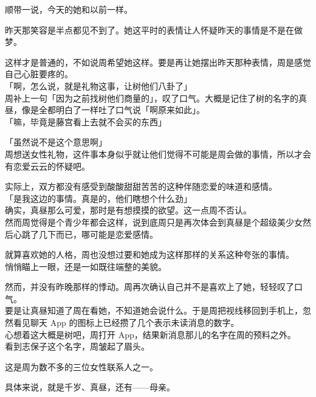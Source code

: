 顺带一说，今天的她和以前一样。

昨天那笑容是半点都见不到了。她这平时的表情让人怀疑昨天的事情是不是在做梦。

这样才是普通的，不如说周希望她这样。要是再让她摆出昨天那种表情，周是感觉自己心脏要疼的。\\

「啊，怎么说，就是礼物这事，让树他们八卦了」\\

周补上一句「因为之前找树他们商量的」，叹了口气。大概是记住了树的名字的真昼，像是全都明白了一样吐了口气说「啊原来如此」。\\

「嘛，毕竟是藤宫看上去就不会买的东西」

「虽然说不是这个意思啊」\\

周想送女性礼物，这件事本身似乎就让他们觉得不可能是周会做的事情，所以才会有恋爱云云的怀疑吧。

实际上，双方都没有感受到酸酸甜甜苦苦的这种伴随恋爱的味道和感情。\\

「是我这边的事情。真是的，他们瞎想个什么劲」\\

确实，真昼那么可爱，那时是有想摸摸的欲望。这一点周不否认。\\

然而周觉得是个青少年都会这样，说到底周只是再次体会到真昼是个超级美少女然后心跳了几下而已，哪可能是恋爱感情。

就算喜欢她的人格，周也没想过要和她成为这样那样的关系这种夸张的事情。\\

悄悄瞄上一眼，还是一如既往端整的美貌。

然而，并没有昨晚那样的悸动。周再次确认自己并不是喜欢上了她，轻轻叹了口气。\\

要是让真昼知道了周在看她，不知道她会说什么。于是周把视线移回到手机上，忽然看见聊天 App 的图标上已经攒了几个表示未读消息的数字。\\

心想着这大概是树吧，周打开 App，结果新消息那儿的名字在周的预料之外。\\

看到志保子这个名字，周皱起了眉头。

这是周为数不多的三位女性联系人之一。

具体来说，就是千岁、真昼，还有——母亲。\\

